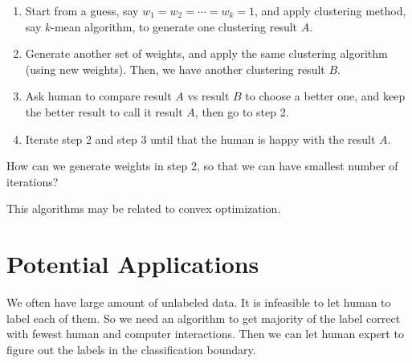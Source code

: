 \documentclass[12pt]{article}
\begin{document}
\begin{enumerate}
	\item Start from a guess, say $w_1=w_2=\cdots=w_k=1$, and apply clustering method, say $k$-mean algorithm, to generate one clustering result $A$.
	\item Generate another set of weights, and apply the same clustering algorithm (using new weights). Then, we have another clustering result $B$. 
	\item Ask human to compare result $A$ vs result $B$ to choose a better one, and keep the better result to call it result $A$, then go to step 2.
	\item Iterate step 2 and step 3 until that the human is happy with the result $A$.  
\end{enumerate}

How can we generate weights in step 2, so that we can have smallest number of iterations?

This algorithms may be related to convex optimization.
\section{Potential Applications}
We often have large amount of unlabeled data. It is infeasible to let human to label each of them. So we need an algorithm to get majority of the label correct with fewest human and computer interactions. Then we can let human expert to figure out the labels in the classification boundary. 




\end{document}
